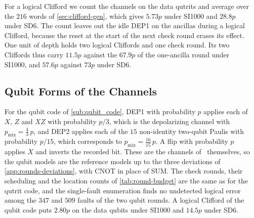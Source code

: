 For a logical Clifford we count the channels on the data qutrits and average over the $216$ words of \autoref{sec:clifford-gen}, which gives $5.73p$ under SI1000 and $28.8p$ under SD6. The count leaves out the idle DEP1 on the ancillas during a logical Clifford, because the reset at the start of the next check round erases its effect. One unit of depth holds two logical Cliffords and one check round. Its two Cliffords thus carry $11.5p$ against the $67.9p$ of the one-ancilla round under SI1000, and $57.6p$ against $73p$ under SD6.

\subsection{Qubit Forms of the Channels}
\label{app:rounds-qubit}

For the qubit code of \autoref{sub:qubit_code}, DEP1 with probability $p$ applies each of $X$, $Z$ and $XZ$ with probability $p/3$, which is the depolarizing channel with $p_{\mathrm{mix}} = \tfrac{4}{3}\,p$, and DEP2 applies each of the $15$ non-identity two-qubit Paulis with probability $p/15$, which corresponds to $p_{\mathrm{mix}} = \tfrac{16}{15}\,p$. A flip with probability $p$ applies $X$ and inverts the recorded bit. These are the channels of~\cite{GidneyHoneycomb2021} themselves, so the qubit models are the reference models up to the three deviations of \autoref{app:rounds-deviations}, with CNOT in place of SUM. The check rounds, their scheduling and the location counts of \autoref{tab:round-budget} are the same as for the qutrit code, and the single-fault enumeration finds no undetected logical error among the $347$ and $509$ faults of the two qubit rounds. A logical Clifford of the qubit code puts $2.80p$ on the data qubits under SI1000 and $14.5p$ under SD6.
